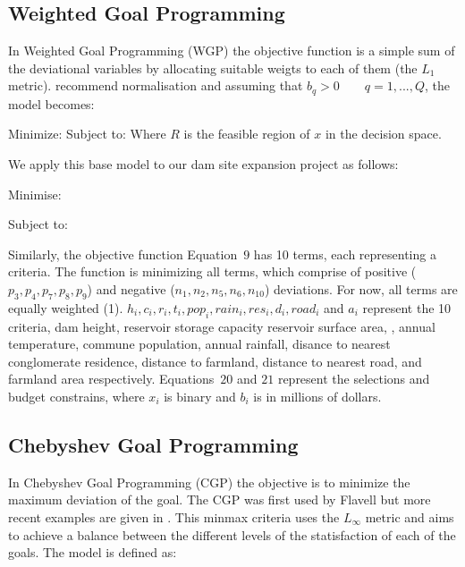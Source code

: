 \subsection{Weighted Goal Programming}
In Weighted Goal Programming (WGP) the objective function is a simple sum of the deviational variables by allocating suitable weigts to each of them (the $L_1 $ metric). \cite{jones2010} recommend normalisation and assuming that $b_q > 0 \qquad q = 1, ..., Q$, the model becomes:

Minimize:
            \EqWGPMinFunctionFive
Subject to:
            \EqGGPMinFunctionSubTwo
            \EqGGPMinFunctionSubThree
            \EqGGPMinFunctionSubFour
Where $R$ is the feasible region of $x$ in the decision space.

We apply this base model to our dam site expansion project as follows:

Minimise:
        \EqDamWGPObjectiveEleven

Subject to:
        \EqDamHeightConstraintTwelve
        \EqDamCapacityConstraintThirteen
        \EqReservoirAreaConstraintFourteen
        \EqTemperatureConstraintFifteen
        \EqPopulationConstraintSixteen
        \EqRainfallConstraintSeventeen
        \EqResidenceConstraintEighteen
        \EqFarmlandDistanceConstraintNineteen
        \EqNearestRoadConstraintTwenty
        \EqFarmlandAreaConstraintTwentyOne
        \EqSelectThreeDamsTwentyTwo
        \EqBudgetConstraintTwentyThree

Similarly, the objective function Equation~$9$ has 10 terms, each representing a criteria. The function is minimizing all terms, which comprise of positive ($p_3,p_4,p_7,p_8,p_9$) and negative ($n_1,n_2,n_5,n_6,n_10$) deviations. For now, all terms are equally weighted (1). $h_i, c_i, r_i, t_i, pop_i, rain_i, res_i, d_i, road_i$ and $a_i$ represent the 10 criteria, dam height, reservoir storage capacity reservoir surface area, ,  annual temperature,   commune population, annual rainfall, disance to nearest conglomerate residence, distance to farmland, distance to nearest road, and farmland area respectively. Equations~$20$ and $21$
represent the selections and budget constrains, where $x_i$ is binary and  $b_i$ is in millions of dollars.

\subsection{Chebyshev Goal Programming}
In Chebyshev Goal Programming (CGP) the objective is to minimize the maximum deviation of the goal. The CGP was first used by Flavell \cite{FLAVELL1976} but more recent examples are given in \cite{Despotis2008,HO2019}. This minmax criteria uses the $L_\infty$ metric and aims to achieve a balance between the different levels of the statisfaction of each of the goals. The model is defined as:

